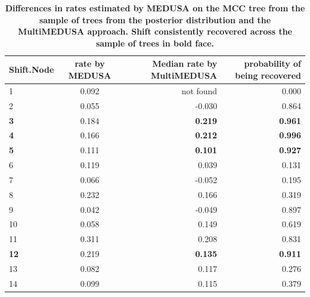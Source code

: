 \documentclass[10pt,letterpaper]{article}
\begin{document}
\begin{table}[!ht]
\begin{adjustwidth}{-2.25in}{0in} %
\caption{{\bf Differences in rates estimated by MEDUSA on the MCC
tree from the sample of trees from the posterior distribution and the
MultiMEDUSA approach. Shift consistently recovered across the
sample of trees in bold face.}}
\begin{tabular}{|l|c|r|r|}
    \hline
Shift.Node & rate by MEDUSA & Median rate by MultiMEDUSA & probability of being recovered \\ \hline
1          & 0.092          & not found                  & 0.000                          \\ \hline
2          & 0.055          & -0.030                     & 0.864                          \\ \hline
\bf{3}     & 0.184          & \bf{0.219}                 & \bf{0.961}                     \\ \hline
\bf{4}     & 0.166          & \bf{0.212}                 & \bf{0.996}                     \\ \hline
\bf{5}     & 0.111          & \bf{0.101}                 & \bf{0.927}                     \\ \hline
6          & 0.119          & 0.039                      & 0.131                          \\ \hline
7          & 0.066          & -0.052                     & 0.195                          \\ \hline
8          & 0.232          & 0.166                      & 0.319                          \\ \hline
9          & 0.042          & -0.049                     & 0.897                          \\ \hline
10         & 0.058          & 0.149                      & 0.619                          \\ \hline
11         & 0.311          & 0.208                      & 0.831                          \\ \hline
\bf{12}    & 0.219          & \bf{0.135}                 & \bf{0.911}                     \\ \hline
13         & 0.082          & 0.117                      & 0.276                          \\ \hline
14         & 0.099          & 0.115                      & 0.379                          \\ \hline

\end{tabular}
\end{adjustwidth}
\end{table}
\end{document}
